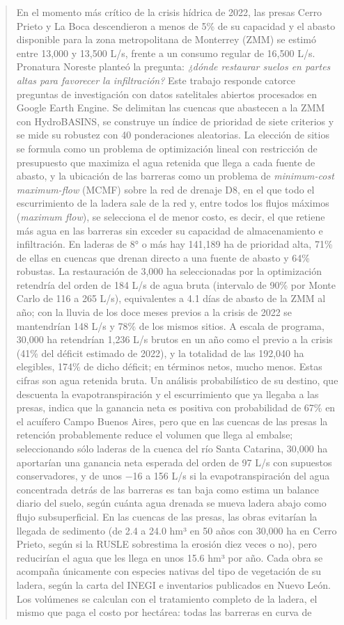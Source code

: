 \documentclass[11pt,letterpaper]{article}
\begin{document}
\begin{abstract}
En el momento más crítico de la crisis hídrica de 2022, las presas Cerro Prieto y La Boca descendieron a menos de 5\% de su capacidad y el abasto disponible para la zona metropolitana de Monterrey (ZMM) se estimó entre 13,000 y 13,500 L/s, frente a un consumo regular de 16,500 L/s. Pronatura Noreste planteó la pregunta: \emph{¿dónde restaurar suelos en partes altas para favorecer la infiltración?} Este trabajo responde catorce preguntas de investigación con datos satelitales abiertos procesados en Google Earth Engine. Se delimitan las cuencas que abastecen a la ZMM con HydroBASINS, se construye un índice de prioridad de siete criterios y se mide su robustez con 40 ponderaciones aleatorias. La elección de sitios se formula como un problema de optimización lineal con restricción de presupuesto que maximiza el agua retenida que llega a cada fuente de abasto, y la ubicación de las barreras como un problema de \emph{minimum-cost maximum-flow} (MCMF) sobre la red de drenaje D8, en el que todo el escurrimiento de la ladera sale de la red y, entre todos los flujos máximos (\emph{maximum flow}), se selecciona el de menor costo, es decir, el que retiene más agua en las barreras sin exceder su capacidad de almacenamiento e infiltración. En laderas de 8° o más hay 141,189 ha de prioridad alta, 71\% de ellas en cuencas que drenan directo a una fuente de abasto y 64\% robustas. La restauración de 3,000 ha seleccionadas por la optimización retendría del orden de 184 L/s de agua bruta (intervalo de 90\% por Monte Carlo de 116 a 265 L/s), equivalentes a 4.1 días de abasto de la ZMM al año; con la lluvia de los doce meses previos a la crisis de 2022 se mantendrían 148 L/s y 78\% de los mismos sitios. A escala de programa, 30,000 ha retendrían 1,236 L/s brutos en un año como el previo a la crisis (41\% del déficit estimado de 2022), y la totalidad de las 192,040 ha elegibles, 174\% de dicho déficit; en términos netos, mucho menos. Estas cifras son agua retenida bruta. Un análisis probabilístico de su destino, que descuenta la evapotranspiración y el escurrimiento que ya llegaba a las presas, indica que la ganancia neta es positiva con probabilidad de 67\% en el acuífero Campo Buenos Aires, pero que en las cuencas de las presas la retención probablemente reduce el volumen que llega al embalse; seleccionando sólo laderas de la cuenca del río Santa Catarina, 30,000 ha aportarían una ganancia neta esperada del orden de 97 L/s con supuestos conservadores, y de unos −16 a 156 L/s si la evapotranspiración del agua concentrada detrás de las barreras es tan baja como estima un balance diario del suelo, según cuánta agua drenada se mueva ladera abajo como flujo subsuperficial. En las cuencas de las presas, las obras evitarían la llegada de sedimento (de 2.4 a 24.0 hm³ en 50 años con 30,000 ha en Cerro Prieto, según si la RUSLE sobrestima la erosión diez veces o no), pero reducirían el agua que les llega en unos 15.6 hm³ por año. Cada obra se acompaña únicamente con especies nativas del tipo de vegetación de su ladera, según la carta del INEGI e inventarios publicados en Nuevo León. Los volúmenes se calculan con el tratamiento completo de la ladera, el mismo que paga el costo por hectárea: todas las barreras en curva de 
\end{abstract}
\end{document}
